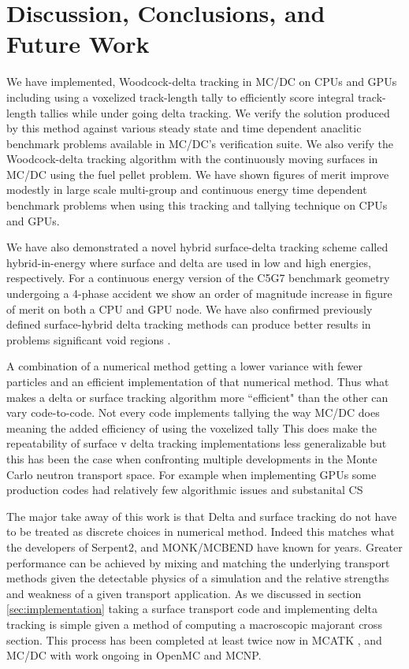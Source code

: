 \section{Discussion, Conclusions, and Future Work}
\label{disucssions}

We have implemented, Woodcock-delta tracking in MC/DC on CPUs and GPUs including using a voxelized track-length tally to efficiently score integral track-length tallies while under going delta tracking.
We verify the solution produced by this method against various steady state and time dependent anaclitic benchmark problems available in MC/DC's verification suite.
We also verify the Woodcock-delta tracking algorithm with the continuously moving surfaces in MC/DC using the fuel pellet problem.
We have shown figures of merit improve modestly in large scale multi-group and continuous energy time dependent benchmark problems when using this tracking and tallying technique on CPUs and GPUs.

We have also demonstrated a novel hybrid surface-delta tracking scheme called hybrid-in-energy where surface and delta are used in low and high energies, respectively.
For a continuous energy version of the C5G7 benchmark geometry undergoing a 4-phase accident we show an order of magnitude increase in figure of merit on both a CPU and GPU node.
We have also confirmed previously defined surface-hybrid delta tracking methods can produce better results in problems significant void regions \cite{leppanen_2010_burnup}.

A combination of a numerical method getting a lower variance with fewer particles and an efficient implementation of that numerical method.
Thus what makes a delta or surface tracking algorithm more ``efficient" than the other can vary code-to-code.
Not every code implements tallying the way MC/DC does meaning the added efficiency of using the voxelized tally 
This does make the repeatability of surface v delta tracking implementations less generalizable but this has been the case when confronting multiple developments in the Monte Carlo neutron transport space.
For example when implementing GPUs some production codes had relatively few algorithmic issues and substanital CS

The major take away of this work is that Delta and surface tracking do not have to be treated as discrete choices in numerical method.
Indeed this matches what the developers of Serpent2, and MONK/MCBEND have known for years.
Greater performance can be achieved by mixing and matching the underlying transport methods given the detectable physics of a simulation and the relative strengths and weakness of a given transport application.
As we discussed in section \ref{sec:implementation} taking a surface transport code and implementing delta tracking is simple given a method of computing a macroscopic majorant cross section.
This process has been completed at least twice now in MCATK \cite{morgan2023delta}, and MC/DC with work ongoing in OpenMC and MCNP. %

